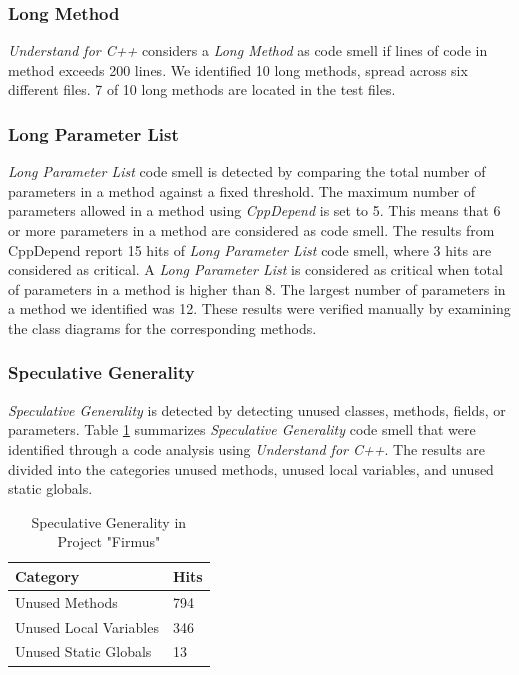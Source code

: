 \subsubsection{Long Method}
\textit{Understand for C++} considers a \textit{Long Method} as code smell if lines of code in method exceeds 200 lines. We identified 10 long methods, spread across six different files. 7 of 10 long methods are located in the test files. 

\subsubsection{Long Parameter List}
\textit{Long Parameter List} code smell is detected by comparing the total number of parameters in a method against a fixed threshold. The maximum number of parameters allowed in a method using \textit{CppDepend} is set to 5. This means that 6 or more parameters in a method are considered as code smell. The results from CppDepend report 15 hits of \textit{Long Parameter List} code smell, where 3 hits are considered as critical. A \textit{Long Parameter List} is considered as critical when total of parameters in a method is higher than 8. The largest number of parameters in a method we identified was 12. These results were verified manually by examining the class diagrams for the corresponding methods.

\subsubsection{Speculative Generality}
\textit{Speculative Generality} is detected by detecting unused classes, methods, fields, or parameters. Table \ref{tab:speculativeGenerality} summarizes \textit{Speculative Generality} code smell that were identified through a code analysis using \textit{Understand for C++}. The results are divided into the categories unused methods, unused local variables, and unused static globals. 

\begin{table}[ht!]
\centering
\caption{Speculative Generality in Project "Firmus"}
\label{tab:speculativeGenerality}
\begin{tabular}{|l|l|}
\hline
\textbf{Category}		& 	\textbf{Hits} \\ \hline
Unused Methods 			&	794  \\ \hline
Unused Local Variables 	& 	346	 \\ \hline
Unused Static Globals 	& 	13	 \\ \hline
\end{tabular}
\end{table}

